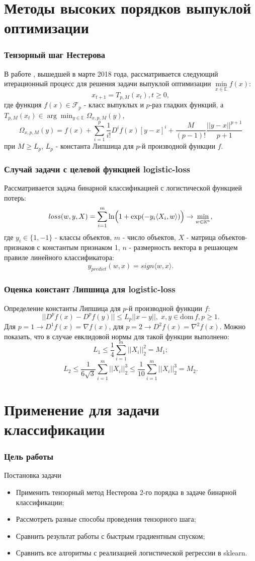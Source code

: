 \documentclass[12pt]{beamer}
\begin{document}
\section{Методы высоких порядков выпуклой оптимизации}
\begin{frame}
\frametitle{Тензорный шаг Нестерова}
В работе \cite{nesterov2018implementable}, вышедшей в марте 2018 года, рассматривается следующий итерационный процесс для решения задачи выпуклой оптимизации $\min\limits_{x \in \mathbb{E}} f(x)$:
$$
x_{t + 1} = T_{p, M}(x_t), t \geq 0,
$$
где функция $f(x) \in \mathcal{F}_p$ - класс выпуклых и $p$-раз гладких функций, а $T_{p, M}(x_t) \in \arg\min_{y \in \mathbb{E}}\Omega_{x, p, M}(y)$, 
$$
\Omega_{x, p, M}(y) = f(x) +  \sum\limits_{i = 1}^p \frac{1}{i!}D^if(x)[y - x]^i + \frac{M}{(p - 1)!}\frac{||y - x||^{p + 1}}{p + 1}
$$
при $M \geq L_p$, $L_p$ - константа Липшица для $p$-й производной функции $f$.
\end{frame}
\begin{frame}
\frametitle{Случай задачи с целевой функцией logistic-loss}
Рассматривается задача бинарной классификацией с логистической функцией потерь:
$$
loss(w, y, X) = \sum\limits_{i = 1}^m \ln\Bigl(1 + \exp(-y_i\langle X_i, w \rangle)\Bigr) \to \min_{w \in \mathbb{R}^n},
$$
где $y_i \in \{1, -1\}$ - классы объектов, $m$ - число объектов, $X$ - матрица объектов-признаков с константым признаком 1, $n$ - размерность вектора в решающем правиле линейного классификатора:
$$
y_{predict}(w, x) = sign \langle w, x\rangle.
$$
\end{frame}
\begin{frame}
\frametitle{Оценка констант Липшица для logistic-loss}
Определение константы Липшица для $p$-й производной функции $f$:
$$
||D^p f(x) - D^p f(y)|| \leq L_p||x - y||, \; x,y \in \mathrm{dom} \, f, p \geq 1.
$$
Для $p = 1 \to D^1 f(x) = \nabla f(x)$, для $p = 2 \to D^2 f(x) = \nabla^2 f(x)$.
Можно показать, что в случае евклидовой нормы для такой функции выполнено:
$$
L_1 \leq \frac{1}{4}\sum\limits_{i = 1}^m ||X_i||_2^2 = M_1;
$$
$$
L_2 \leq \frac{1}{6\sqrt{3}}\sum\limits_{i = 1}^m ||X_i||_2^3 \leq \frac{1}{10}\sum\limits_{i = 1}^m ||X_i||_2^3 = M_2. 
$$
\end{frame}
\section{Применение для задачи классификации}
\begin{frame}
\frametitle{Цель работы}
\begin{block}{Постановка задачи}
\begin{itemize}
	\item Применить тензорный метод Нестерова 2-го порядка в задаче бинарной классификации;
	\item Рассмотреть разные способы проведения тензорного шага;
	\item Сравнить результат работы с быстрым градиентным спуском;
	\item Сравнить все алгоритмы с реализацией логистической регрессии в sklearn.
\end{itemize}
\end{block}
\end{frame}
\end{document}
